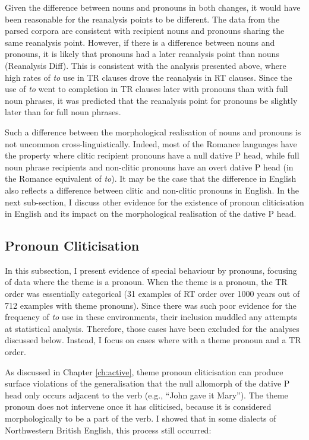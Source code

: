    Given the difference between nouns and pronouns in both changes, it would have been reasonable for the reanalysis points to be different. The data from the parsed corpora are consistent with recipient nouns and pronouns sharing the same reanalysis point. However, if there is a difference between nouns and pronouns, it is likely that pronouns had a later reanalysis point than nouns (Reanalysis Diff). This is consistent with the analysis presented above, where high rates of \textit{to} use in TR clauses drove the reanalysis in RT clauses. Since the use of \textit{to} went to completion in TR clauses later with pronouns than with full noun phrases, it was predicted that the reanalysis point for pronouns be slightly later than for full noun phrases.

   Such a difference between the morphological realisation of nouns and pronouns is not uncommon cross-linguistically. Indeed, most of the Romance languages have the property where clitic recipient pronouns have a null dative P head, while full noun phrase recipients and non-clitic pronouns have an overt dative P head (in the Romance equivalent of \textit{to}). It may be the case that the difference in English also reflects a difference between clitic and non-clitic pronouns in English. In the next sub-section, I discuss other evidence for the existence of pronoun cliticisation in English and its impact on the morphological realisation of the dative P head.
    
	\subsection{Pronoun Cliticisation}\label{sec:act-tp}
	In this subsection, I present evidence of special behaviour by pronouns, focusing of data where the theme is a pronoun. When the theme is a pronoun, the TR order was essentially categorical (31 examples of RT order over 1000 years out of 712 examples with theme pronouns). Since there was such poor evidence for the frequency of \textit{to} use in these environments, their inclusion muddled any attempts at statistical analysis. Therefore, those cases have been excluded for the analyses discussed below. Instead, I focus on cases where with a theme pronoun and a TR order.

	As discussed in Chapter \ref{ch:active}, theme pronoun cliticisation can produce surface violations of the generalisation that the null allomorph of the dative P head only occurs adjacent to the verb (e.g., ``John gave it Mary''). The theme pronoun does not intervene once it has cliticised, because it is considered morphologically to be a part of the verb. I showed that in some dialects of Northwestern British English, this process still occurred:

